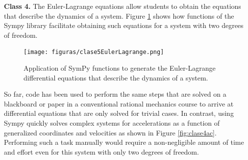 





\textbf{Class 4.} The Euler-Lagrange equations allow students to obtain the equations that describe the dynamics of a system. Figure \ref{fig:clase4euler} shows how functions of the Sympy library facilitate obtaining such equations for a system with two degrees of freedom.

\begin{figure}[!ht]
\centering
\texttt{[image: figuras/clase5EulerLagrange.png]}
\caption{Application of SymPy functions to generate the Euler-Lagrange differential equations that describe the dynamics of a system.}
\label{fig:clase4euler}
\end{figure}

So far, code has been used to perform the same steps that are solved on a blackboard or paper in a conventional rational mechanics course to arrive at differential equations that are only solved for trivial cases. In contrast, using Sympy quickly solves complex systems for accelerations as a function of generalized coordinates and velocities as shown in Figure \ref{fig:clase4ac}. Performing such a task manually would require a non-negligible amount of time and effort even for this system with only two degrees of freedom.


